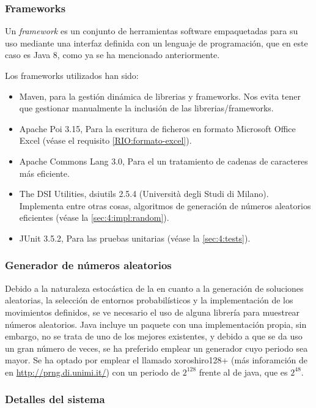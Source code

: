 \subsubsection{Frameworks}
Un \textit{framework} es un conjunto de herramientas software empaquetadas para su uso mediante una interfaz definida con un lenguaje de programación, que en este caso es Java 8, como ya se ha mencionado anteriormente.

Los frameworks utilizados han sido:

\begin{itemize}
	\item Maven, para la gestión dinámica de librerias y frameworks. Nos evita tener que gestionar manualmente la inclusión de las librerias/frameworks.
	\item Apache Poi 3.15, Para la escritura de ficheros en formato Microsoft Office Excel (véase el requisito \ref{RIO:formato-excel}).
	\item Apache Commons Lang 3.0, Para el un tratamiento de cadenas de caracteres más eficiente.
	\item The DSI Utilities, dsiutils 2.5.4 (Università degli Studi di Milano). Implementa entre otras cosas, algoritmos de generación de números aleatorios eficientes (véase la \autoref{sec:4:impl:random}).
	\item JUnit 3.5.2, Para las pruebas unitarias (véase la \autoref{sec:4:tests}).
\end{itemize}

\subsubsection{Generador de números aleatorios}
\label{sec:4:impl:random}

Debido a la naturaleza estocástica de la \fasedos{} en cuanto a la generación de soluciones aleatorias, la selección de entornos probabilísticos y la implementación de los movimientos definidos, se ve necesario el uso de alguna librería para muestrear números aleatorios. Java incluye un paquete con una implementación propia, sin embargo, no se trata de uno de los mejores existentes, y debido a que se da uso un gran número de veces, se ha preferido emplear un generador cuyo periodo sea mayor. Se ha optado por emplear el llamado xoroshiro128+ (más inforamción de en \url{http://prng.di.unimi.it/}) con un periodo de $2^{128}$ frente al de java, que es $2^{48}$.

\subsubsection{Detalles del sistema}
\label{sec:4:detalles-sistema}

